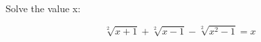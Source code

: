\documentclass{article}
\begin{document}
Solve the value x:

\begin{equation*}
\sqrt[2]{x+1} + \sqrt[2]{x-1} - \sqrt[2]{x^2-1} = x
\end{equation*}
\end{document}
